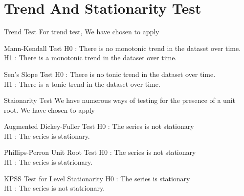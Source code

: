 \documentclass{beamer}
\begin{document}
	\section{Trend And Stationarity Test}
	\begin{frame}{Trend Test}
		For trend test, We have chosen to apply
		
		\begin{block}{ Mann-Kendall Test}
			H0 : There is no monotonic trend in the dataset over time. \\
			H1 : There is a monotonic trend in the dataset over time. \vspace{5pt}
		\end{block}
		
		\begin{exampleblock}{Sen's Slope Test}
			H0 : There is no tonic trend in the dataset over time. \\
			H1 : There is a tonic trend in the dataset over time. \vspace{5pt}
		\end{exampleblock}
	\end{frame}

	\begin{frame}{Staionarity Test}
		We have numerous ways of testing for the presence of a unit root. 
		We have chosen to apply
		
		\begin{block}{Augmented Dickey-Fuller Test}
			H0 : The series is not stationary \\
			H1 : The series is stationary. \vspace{5pt}
		\end{block}
	
		\begin{exampleblock}{Phillips-Perron Unit Root Test}
			H0 : The series is not stationary \\
			H1 : The series is statrionary. \vspace{5pt}
		\end{exampleblock}
		
		\begin{alertblock}{KPSS Test for Level Stationarity}
			H0 : The series is stationary \\
			H1 : The series is not statrionary. \vspace{5pt}
		\end{alertblock}
	\end{frame}
	
\end{document}
